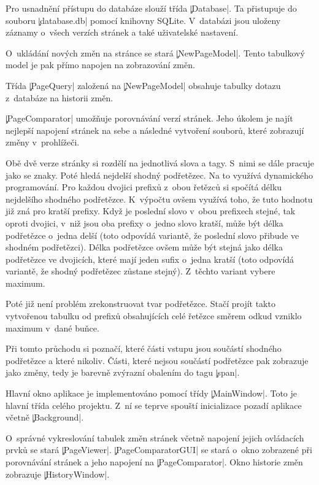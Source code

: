 Pro usnadnění přístupu do databáze slouží třída \c|Database|.
Ta přistupuje do souboru \c|database.db| %
pomocí knihovny SQLite.
V~databázi jsou uloženy záznamy o~všech verzích stránek a také uživatelské nastavení.

O~ukládání nových změn na stránce se stará \c|NewPageModel|. Tento tabulkový model je pak přímo napojen na zobrazování změn.

Třída \c|PageQuery| založená na \c|NewPageModel| obsahuje tabulky dotazu z~databáze na historii změn.

\c|PageComparator| umožňuje porovnávání verzí stránek.
Jeho úkolem je najít nejlepší napojení stránek na sebe a následné vytvoření souborů, které zobrazují změny v~prohlížeči.

Obě dvě verze stránky si rozdělí na jednotlivá slova a tagy. S~nimi se dále pracuje jako se znaky.
Poté hledá nejdelší shodný podřetězec.
Na to využívá dynamického programování.
Pro každou dvojici prefixů z~obou řetězců si spočítá délku nejdelšího shodného podřetězce.
K~výpočtu ovšem využívá toho, že tuto hodnotu již zná pro kratší prefixy.
Když je poslední slovo v~obou prefixech stejné, tak oproti dvojici, v~niž jsou oba prefixy o~jedno slovo kratší, může být délka podřetězce o~jedna delší (toto odpovídá variantě, že poslední slovo přibude ve shodném podřetězci).
Délka podřetězce ovšem může být stejná jako délka podřetězce ve dvojicích, které mají jeden sufix o~jedna kratší (toto odpovídá variantě, že shodný podřetězec zůstane stejný).
Z~těchto variant vybere maximum.

Poté již není problém zrekonstruovat tvar podřetězce.
Stačí projít takto vytvořenou tabulku od prefixů obsahujících celé řetězce směrem odkud vzniklo maximum v~dané buňce.

Při tomto průchodu si poznačí, které části vstupu jsou součástí shodného podřetězce a které nikoliv.
Části, které nejsou součástí podřetězce pak zobrazuje jako změny, tedy je barevně zvýrazní obalením do tagu \c|span|.




Hlavní okno aplikace je implementováno pomocí třídy \c|MainWindow|. Toto je hlavní třída celého projektu.
Z~ní se teprve spouští inicializace pozadí aplikace včetně \c|Background|.

O~správné vykreslování tabulek změn stránek včetně napojení jejich ovládacích prvků se stará \c|PageViewer|.
\c|PageComparatorGUI| se stará o~okno zobrazené při porovnávání stránek a jeho napojení na \c|PageComparator|.
Okno historie změn zobrazuje \c|HistoryWindow|.

